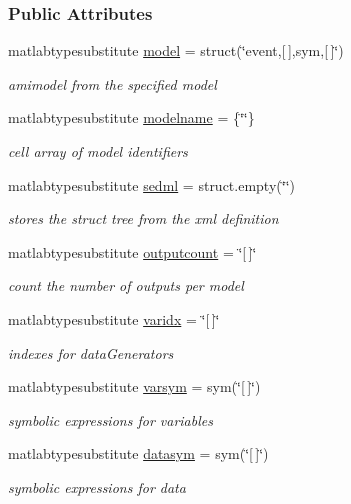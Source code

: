\subsubsection*{Public Attributes}
\begin{DoxyCompactItemize}
\item 
matlabtypesubstitute \mbox{\hyperlink{classamised_a508cc3106d2c29fe07dc87cbe3ea6927}{model}} = struct(\char`\"{}\textquotesingle{}event\textquotesingle{},\mbox{[}$\,$\mbox{]},\textquotesingle{}sym\textquotesingle{},\mbox{[}$\,$\mbox{]}\char`\"{})
\begin{DoxyCompactList}\small\item\em amimodel from the specified model \end{DoxyCompactList}\item 
matlabtypesubstitute \mbox{\hyperlink{classamised_a71bca9c21a6de42d8079ade31cb61044}{modelname}} = \{\char`\"{}\char`\"{}\}
\begin{DoxyCompactList}\small\item\em cell array of model identifiers \end{DoxyCompactList}\item 
matlabtypesubstitute \mbox{\hyperlink{classamised_a85ed334cf4c17568e28b725e3b755135}{sedml}} = struct.\+empty(\char`\"{}\char`\"{})
\begin{DoxyCompactList}\small\item\em stores the struct tree from the xml definition \end{DoxyCompactList}\item 
matlabtypesubstitute \mbox{\hyperlink{classamised_a2d1dd5be3732d16dc0d0feea17e03f04}{outputcount}} = \char`\"{}\mbox{[}$\,$\mbox{]}\char`\"{}
\begin{DoxyCompactList}\small\item\em count the number of outputs per model \end{DoxyCompactList}\item 
matlabtypesubstitute \mbox{\hyperlink{classamised_ad29088fdb92d731f3c64c6d2bd2ab43c}{varidx}} = \char`\"{}\mbox{[}$\,$\mbox{]}\char`\"{}
\begin{DoxyCompactList}\small\item\em indexes for data\+Generators \end{DoxyCompactList}\item 
matlabtypesubstitute \mbox{\hyperlink{classamised_ac797dd450a486506c269d236f884a292}{varsym}} = sym(\char`\"{}\mbox{[}$\,$\mbox{]}\char`\"{})
\begin{DoxyCompactList}\small\item\em symbolic expressions for variables \end{DoxyCompactList}\item 
matlabtypesubstitute \mbox{\hyperlink{classamised_a38785e52a777bfe687f5418a2dcb44b7}{datasym}} = sym(\char`\"{}\mbox{[}$\,$\mbox{]}\char`\"{})
\begin{DoxyCompactList}\small\item\em symbolic expressions for data \end{DoxyCompactList}\end{DoxyCompactItemize}



